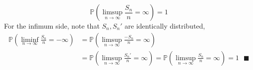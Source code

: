 \documentclass[a4paper,12pt,twoside]{book}
\begin{document}
\begin{itemize}
	\begin{equation}
		\mathbb{P}\left(\limsup\limits_{n\rightarrow\infty}\frac{S_n}{n}=\infty\right)=1
	\end{equation}
	For the infimum side, note that $S_n, S_n'$ are identically distributed,
	\begin{equation}
		\begin{split}
			\mathbb{P}\left(\liminf\limits_{n\rightarrow\infty}\frac{S_n}{n}=-\infty\right)&
			=\mathbb{P}\left(\limsup\limits_{n\rightarrow\infty}\frac{-S_n}{n}=\infty\right)\\
			&=\mathbb{P}\left(\limsup\limits_{n\rightarrow\infty}\frac{S_n'}{n}=\infty\right)=\mathbb{P}\left(\limsup\limits_{n\rightarrow\infty}\frac{S_n}{n}=\infty\right)=1~~~\blacksquare
		\end{split}
	\end{equation}
\end{itemize}
\end{document}

